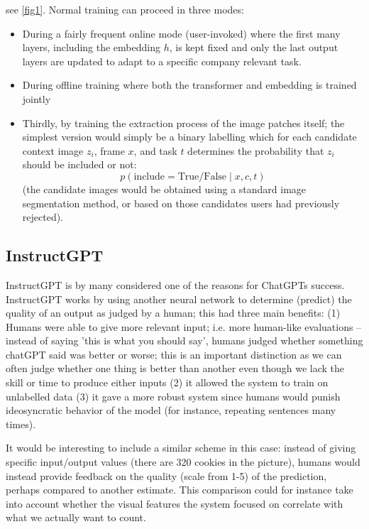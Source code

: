 \documentclass{article}
\begin{document}
see \cref{fig1}. Normal training can proceed in three modes:
\begin{itemize}
    \item During a fairly frequent online mode (user-invoked) where the first many layers, including the embedding $h$, is kept fixed and only the last output layers are updated to adapt to a specific company relevant task. 
    \item During offline training where both the transformer and embedding is trained jointly
    \item Thirdly, by training the extraction process of the image patches itself; the simplest version would simply be a binary labelling which for each candidate context image $z_i$, frame $x$, and task $t$ determines the probability that $z_i$ should be included or not:
    $$
    p(\textrm{include} = \textrm{True}/\textrm{False} \mid x, c, t)
    $$
(the candidate images would be obtained using a standard image segmentation method, or based on those candidates users had previously rejected).
\end{itemize} 

\subsection{InstructGPT}
InstructGPT is by many considered one of the reasons for ChatGPTs success. InstructGPT works by using another neural network to determine (predict) the quality of an output as judged by a human; this had three main benefits: (1) Humans were able to give more relevant input; i.e. more human-like evaluations -- instead of saying 'this is what you should say', humans judged whether something chatGPT said was better or worse; this is an important distinction as we can often judge whether one thing is better than another even though we lack the skill or time to produce either inputs  (2) it allowed the system to train on unlabelled data (3) it gave a more robust system since humans would punish ideosyncratic behavior of the model (for instance, repeating sentences many times).

It would be interesting to include a similar scheme in this case: instead of giving specific input/output values (there are 320 cookies in the picture), humans would instead provide feedback on the quality (scale from 1-5) of the prediction, perhaps compared to another estimate. This comparison could for instance take into account whether the visual features the system focused on correlate with what we actually want to count.
\end{document}
